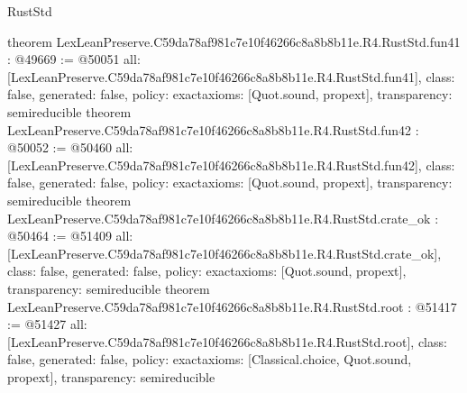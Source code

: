 \begin{lexlean}{RustStd}
\begin{coremodule}
{}
theorem LexLeanPreserve.C59da78af981c7e10f46266c8a8b8b11e.R4.RustStd.fun41 : @49669 := @50051 {
  all: [LexLeanPreserve.C59da78af981c7e10f46266c8a8b8b11e.R4.RustStd.fun41],
  class: false,
  generated: false,
  policy: exact{axioms: [Quot.sound, propext]},
  transparency: semireducible
}
theorem LexLeanPreserve.C59da78af981c7e10f46266c8a8b8b11e.R4.RustStd.fun42 : @50052 := @50460 {
  all: [LexLeanPreserve.C59da78af981c7e10f46266c8a8b8b11e.R4.RustStd.fun42],
  class: false,
  generated: false,
  policy: exact{axioms: [Quot.sound, propext]},
  transparency: semireducible
}
theorem LexLeanPreserve.C59da78af981c7e10f46266c8a8b8b11e.R4.RustStd.crate_ok : @50464 := @51409 {
  all: [LexLeanPreserve.C59da78af981c7e10f46266c8a8b8b11e.R4.RustStd.crate_ok],
  class: false,
  generated: false,
  policy: exact{axioms: [Quot.sound, propext]},
  transparency: semireducible
}
theorem LexLeanPreserve.C59da78af981c7e10f46266c8a8b8b11e.R4.RustStd.root : @51417 := @51427 {
  all: [LexLeanPreserve.C59da78af981c7e10f46266c8a8b8b11e.R4.RustStd.root],
  class: false,
  generated: false,
  policy: exact{axioms: [Classical.choice, Quot.sound, propext]},
  transparency: semireducible
}


\end{coremodule}
\end{lexlean}
